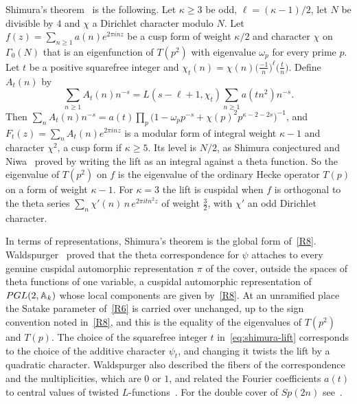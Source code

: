 Shimura's theorem~\cite{Sh73} is the following. Let $\kappa\ge3$ be odd,
$\ell=(\kappa-1)/2$, let $N$ be divisible by $4$ and $\chi$ a
Dirichlet character modulo $N$. Let $f(z)=\sum_{n\ge1}a(n)e^{2\pi inz}$
be a cusp form of weight $\kappa/2$ and character $\chi$ on $\Gamma_0(N)$
that is an eigenfunction of $T(p^2)$ with eigenvalue $\omega_p$ for
every prime $p$. Let $t$ be a positive squarefree integer and
$\chi_t(n)=\chi(n)\bigl(\frac{-1}n\bigr)^\ell\bigl(\frac tn\bigr)$.
Define $A_t(n)$ by
\begin{equation}\label{eq:shimura-lift}
\sum_{n\ge1}A_t(n)n^{-s}=L(s-\ell+1,\chi_t)\sum_{n\ge1}a(tn^2)n^{-s}.
\end{equation}
Then $\sum_nA_t(n)n^{-s}=a(t)\prod_p\bigl(1-\omega_pp^{-s}+\chi(p)^2
p^{\kappa-2-2s}\bigr)^{-1}$, and $F_t(z)=\sum_nA_t(n)e^{2\pi inz}$ is a
modular form of integral weight $\kappa-1$ and character $\chi^2$, a cusp
form if $\kappa\ge5$. Its level is $N/2$, as Shimura conjectured and
Niwa~\cite{Ni75} proved by writing the lift as an integral against a
theta function. So the eigenvalue of $T(p^2)$ on $f$ is the eigenvalue of
the ordinary Hecke operator $T(p)$ on a form of weight $\kappa-1$. For
$\kappa=3$ the lift is cuspidal when $f$ is orthogonal to the theta
series $\sum_n\chi'(n)\,n\,e^{2\pi itn^2z}$ of weight $\frac32$, with
$\chi'$ an odd Dirichlet character.

In terms of representations, Shimura's theorem is the global form
of~\ref{R8}. Waldspurger~\cite{Wa80,Wa91} proved that the theta
correspondence for $\psi$ attaches to every genuine cuspidal automorphic
representation $\pi$ of the cover, outside the spaces of theta functions
of one variable, a cuspidal automorphic representation of $PGL(2,\mathbb{A}_k)$
whose local components are given by~\ref{R8}. At an unramified place the
Satake parameter of~\ref{R6} is carried over unchanged, up to the sign
convention noted in~\ref{R8}, and this is the equality of the eigenvalues
of $T(p^2)$ and $T(p)$. The choice of the
squarefree integer $t$ in~\eqref{eq:shimura-lift} corresponds to the
choice of the additive character $\psi_t$, and changing it twists the
lift by a quadratic character. Waldspurger also described the fibers of
the correspondence and the multiplicities, which are $0$ or $1$, and
related the Fourier coefficients $a(t)$ to central values of twisted
$L$-functions~\cite{Wa81}. For the double cover of $Sp(2n)$
see~\cite{GI18}.

